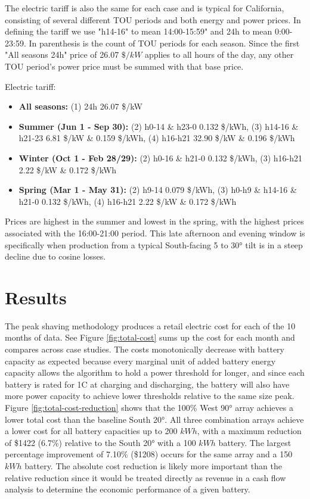 \documentclass[conference]{IEEEtran}
\begin{document}
The electric tariff is also the same for each case and is typical for California, consisting of several different TOU periods and both energy and power prices. In defining the tariff we use "h14-16" to mean 14:00-15:59" and 24h to mean 0:00-23:59. In parenthesis is the count of TOU periods for each season. Since the first "All seasons 24h" price of 26.07 $\$/kW$ applies to all hours of the day, any other TOU period's power price must be summed with that base price.

Electric tariff:
\begin{itemize}
\item \textbf{All seasons:} (1) 24h 26.07 \$/kW
    \item \textbf{Summer (Jun 1 - Sep 30):} (2) h0-14 \& h23-0  0.132 \$/kWh, (3) h14-16 \& h21-23 6.81 \$/kW \& 0.159 \$/kWh, (4) h16-h21 32.90 \$/kW \& 0.196 \$/kWh
    \item     \textbf{Winter (Oct 1 - Feb 28/29):} (2) h0-16 \& h21-0  0.132 \$/kWh, (3) h16-h21 2.22 \$/kW \& 0.172 \$/kWh
    \item \textbf{Spring (Mar 1 - May 31):} (2) h9-14 0.079 \$/kWh, (3) h0-h9 \& h14-16 \& h21-0 0.132 \$/kWh, (4) h16-h21 2.22 \$/kW \& 0.172 \$/kWh
\end{itemize}

Prices are highest in the summer and lowest in the spring, with the highest prices associated with the 16:00-21:00 period. This late afternoon and evening window is specifically when production from a typical South-facing 5 to 30° tilt is in a steep decline due to cosine losses. 


\section{Results}

The peak shaving methodology produces a retail electric cost for each of the 10 months of data. See Figure \ref{fig:total-cost} sums up the cost for each month and compares across case studies. The costs monotonically decrease with battery capacity as expected because every marginal unit of added battery energy capacity allows the algorithm to hold a power threshold for longer, and since each battery is rated for 1C at charging and discharging, the battery will also have more power capacity to achieve lower thresholds relative to the same size peak. Figure \ref{fig:total-cost-reduction} shows that the 100\% West 90° array achieves a lower total cost than the baseline South 20°. All three combination arrays achieve a lower cost for all battery capacities up to 200 $kWh$, with a maximum reduction of \$1422 (6.7\%) relative to the South 20° with a 100 $kWh$ battery. The largest percentage improvement of 7.10\% (\$1208) occurs for the same array and a 150 $kWh$ battery. The absolute cost reduction is likely more important than the relative reduction since it would be treated directly as revenue in a cash flow analysis to determine the economic performance of a given battery.
\end{document}
